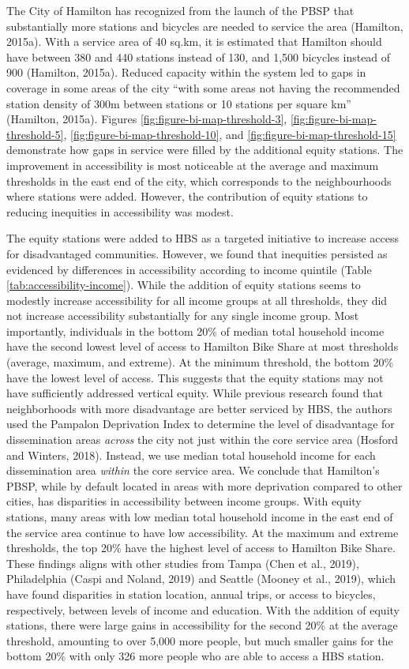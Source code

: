 \documentclass[]{elsarticle} %
\begin{document}
The City of Hamilton has recognized from the launch of the PBSP that
substantially more stations and bicycles are needed to service the area
(Hamilton, 2015a). With a service area of 40 sq.km, it is estimated that
Hamilton should have between 380 and 440 stations instead of 130, and
1,500 bicycles instead of 900 (Hamilton, 2015a). Reduced capacity within
the system led to gaps in coverage in some areas of the city ``with some
areas not having the recommended station density of 300m between
stations or 10 stations per square km'' (Hamilton, 2015a). Figures
\ref{fig:figure-bi-map-threshold-3},
\ref{fig:figure-bi-map-threshold-5},
\ref{fig:figure-bi-map-threshold-10}, and
\ref{fig:figure-bi-map-threshold-15} demonstrate how gaps in service
were filled by the additional equity stations. The improvement in
accessibility is most noticeable at the average and maximum thresholds
in the east end of the city, which corresponds to the neighbourhoods
where stations were added. However, the contribution of equity stations
to reducing inequities in accessibility was modest.

The equity stations were added to HBS as a targeted initiative to
increase access for disadvantaged communities. However, we found that
inequities persisted as evidenced by differences in accessibility
according to income quintile (Table \ref{tab:accessibility-income}).
While the addition of equity stations seems to modestly increase
accessibility for all income groups at all thresholds, they did not
increase accessibility substantially for any single income group. Most
importantly, individuals in the bottom 20\% of median total household
income have the second lowest level of access to Hamilton Bike Share at
most thresholds (average, maximum, and extreme). At the minimum
threshold, the bottom 20\% have the lowest level of access. This
suggests that the equity stations may not have sufficiently addressed
vertical equity. While previous research found that neighborhoods with
more disadvantage are better serviced by HBS, the authors used the
Pampalon Deprivation Index to determine the level of disadvantage for
dissemination areas \emph{across} the city not just within the core
service area (Hosford and Winters, 2018). Instead, we use median total
household income for each dissemination area \emph{within} the core
service area. We conclude that Hamilton's PBSP, while by default located
in areas with more deprivation compared to other cities, has disparities
in accessibility between income groups. With equity stations, many areas
with low median total household income in the east end of the service
area continue to have low accessibility. At the maximum and extreme
thresholds, the top 20\% have the highest level of access to Hamilton
Bike Share. These findings aligns with other studies from Tampa (Chen et
al., 2019), Philadelphia (Caspi and Noland, 2019) and Seattle (Mooney et
al., 2019), which have found disparities in station location, annual
trips, or access to bicycles, respectively, between levels of income and
education. With the addition of equity stations, there were large gains
in accessibility for the second 20\% at the average threshold, amounting
to over 5,000 more people, but much smaller gains for the bottom 20\%
with only 326 more people who are able to access a HBS station.
\end{document}
